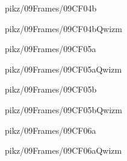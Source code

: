 \documentclass[9pt,xcolor={svgnames, x11names}]{beamer}
\begin{document}

\begin{frame}{pikz/09Frames/09CF04b}
  
\end{frame}


\begin{frame}{pikz/09Frames/09CF04bQwizm}
  
\end{frame}


\begin{frame}{pikz/09Frames/09CF05a}
  
\end{frame}


\begin{frame}{pikz/09Frames/09CF05aQwizm}
  
\end{frame}


\begin{frame}{pikz/09Frames/09CF05b}
  
\end{frame}


\begin{frame}{pikz/09Frames/09CF05bQwizm}
  
\end{frame}


\begin{frame}{pikz/09Frames/09CF06a}
  
\end{frame}


\begin{frame}{pikz/09Frames/09CF06aQwizm}
  
\end{frame}
\end{document}
